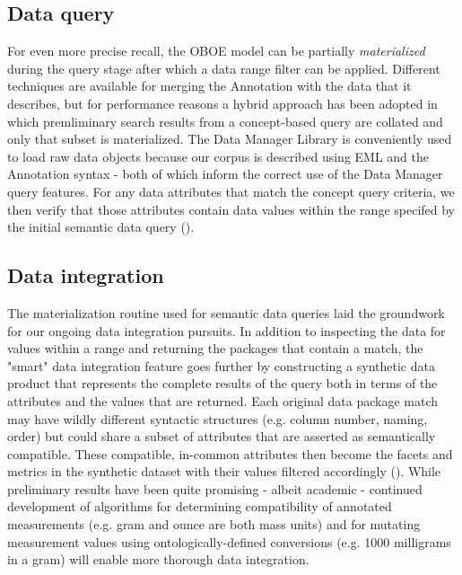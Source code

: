 \subsection{Data query}
For even more precise recall, the OBOE model can be partially \emph{materialized} during the query stage after which a data range filter can be applied. Different techniques are available for merging the Annotation with the data that it describes, but for performance reasons a hybrid approach has been adopted in which premliminary search results from a concept-based query are collated and only that subset is materialized. The Data Manager Library is conveniently used to load raw data objects because our corpus is described using EML and the Annotation syntax - both of which inform the correct use of the Data Manager query features. For any data attributes that match the concept query criteria, we then verify that those attributes contain data values within the range specifed by the initial semantic data query ().

\subsection{Data integration}
The materialization routine used for semantic data queries laid the groundwork for our ongoing data integration pursuits.
In addition to inspecting the data for values within a range and returning the packages that contain a match, the "smart" data integration feature goes further by constructing a synthetic data product that represents the complete results of the query both in terms of the attributes and the values that are returned. Each original data package match may have wildly different syntactic structures (e.g. column number, naming, order) but could share a subset of attributes that are asserted as semantically compatible. These compatible, in-common attributes then become the facets and metrics in the synthetic dataset with their values filtered accordingly (). While preliminary results have been quite promising - albeit academic - continued development of algorithms for determining compatibility of annotated measurements (e.g. gram and ounce are both mass units) and for mutating measurement values using ontologically-defined conversions (e.g. 1000 milligrams in a gram) will enable more thorough data integration.


